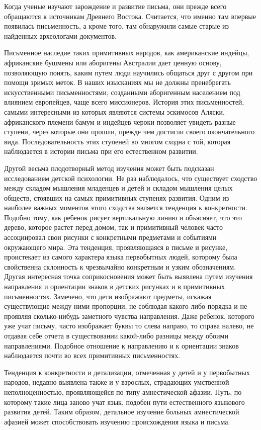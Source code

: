   Когда ученые изучают зарождение и развитие письма, они прежде всего
  обращаются к источникам Древнего Востока. Считается, что именно там впервые
  появилась письменность, а кроме того, там обнаружили самые старые из
  найденных археологами документов.
  
  Письменное наследие таких примитивных народов, как американские индейцы,
  африканские бушмены или аборигены Австралии дает ценную основу, позволяющую
  понять, каким путем люди научились общаться друг с другом при помощи зримых
  меток. В наших изысканиях мы не должны пренебрегать искусственными
  письменностями, созданными аборигенным населением под влиянием европейцев,
  чаще всего миссионеров. История этих письменностей, самыми интересными из
  которых являются системы эскимосов Аляски, африканского племени бамум и
  индейцев чероки позволяет увидеть разные ступени, через которые они прошли,
  прежде чем достигли своего окончательного вида. Последовательность этих
  ступеней во многом сходна с той, которая наблюдается в истории письма при его
  естественном развитии.
  
  Другой весьма плодотворный метод изучения может быть подсказан исследованием
  детской психологии. Не раз наблюдалось, что существует сходство между складом
  мышления младенцев и детей и складом мышления целых обществ, стоявших на
  самых примитивных ступенях развития. Одним из наиболее важных моментов этого
  сходства является тенденция к конкретности. Подобно тому, как ребенок рисует
  вертикальную линию и объясняет, что это дерево, которое растет перед домом,
  так и примитивный человек часто ассоциировал свои рисунки с конкретными
  предметами и событиями окружающего мира. Эта тенденция, проявляющаяся в
  письме и рисунке, проистекает из самого характера языка первобытных людей,
  которому была свойственна склонность к чрезвычайно конкретным и узким
  обозначениям. Другая интересная точка соприкосновения может быть выявлена
  путем изучения направления и ориентации знаков в детских рисунках и в
  примитивных письменностях. Замечено, что дети изображают предметы, искажая
  существующие между ними пропорции, не соблюдая какого-либо порядка и не
  проявляя сколько-нибудь заметного чувства направления. Даже ребенок, которого
  уже учат письму, часто изображает буквы то слева направо, то справа налево,
  не отдавая себе отчета в существовании какой-либо разницы между обоими
  направлениями. Подобное отношение к направлению и к ориентации знаков
  наблюдается почти во всех примитивных письменностях.
  
  Тенденция к конкретности и детализации, отмеченная у детей и у первобытных
  народов, недавно выявлена также и у взрослых, страдающих умственной
  неполноценностью, проявляющейся по типу амнестической афазии. Путь, по
  которому такие лица заново учат язык, подобен пути естественного языкового
  развития детей. Таким образом, детальное изучение больных амнестической
  афазией может способствовать изучению происхождения языка и письма.~\cite{bib:1}
  

